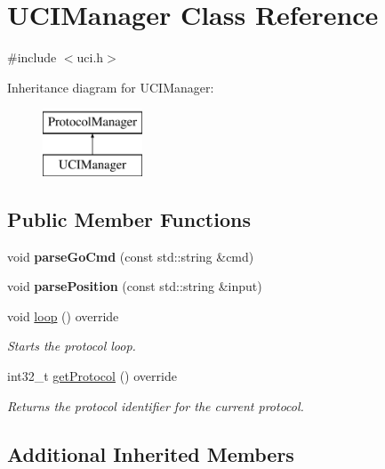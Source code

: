 \hypertarget{classUCIManager}{}\section{U\+C\+I\+Manager Class Reference}
\label{classUCIManager}


{\ttfamily \#include $<$uci.\+h$>$}

Inheritance diagram for U\+C\+I\+Manager\+:\begin{figure}[H]
\begin{center}
\leavevmode
\includegraphics[height=2.000000cm]{classUCIManager}
\end{center}
\end{figure}
\subsection*{Public Member Functions}
\begin{DoxyCompactItemize}
\item 
\mbox{\label{classUCIManager_aa8959f05532509ccee25ef91e3edde63}} 
void {\bfseries parse\+Go\+Cmd} (const std\+::string \&cmd)
\item 
\mbox{\label{classUCIManager_a71a9473ca9e8ba6486c77326dace417e}} 
void {\bfseries parse\+Position} (const std\+::string \&input)
\item 
void \mbox{\hyperlink{classUCIManager_aa2fa2a352e6d58f00c8388da0d8541e1}{loop}} () override
\begin{DoxyCompactList}\small\item\em Starts the protocol loop. \end{DoxyCompactList}\item 
int32\+\_\+t \mbox{\hyperlink{classUCIManager_af85c53751a85a5cb624e10fb1f9962c7}{get\+Protocol}} () override
\begin{DoxyCompactList}\small\item\em Returns the protocol identifier for the current protocol. \end{DoxyCompactList}\end{DoxyCompactItemize}
\subsection*{Additional Inherited Members}


